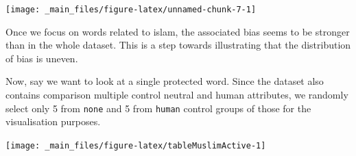 \documentclass[12pt,]{book}
\newenvironment{Shaded}{\begin{snugshade}}{\end{snugshade}}
\newcommand{\KeywordTok}[1]{\textcolor[rgb]{0.13,0.29,0.53}{\textbf{#1}}}
\newcommand{\DecValTok}[1]{\textcolor[rgb]{0.00,0.00,0.81}{#1}}
\newcommand{\StringTok}[1]{\textcolor[rgb]{0.31,0.60,0.02}{#1}}
\newcommand{\CommentTok}[1]{\textcolor[rgb]{0.56,0.35,0.01}{\textit{#1}}}
\newcommand{\OperatorTok}[1]{\textcolor[rgb]{0.81,0.36,0.00}{\textbf{#1}}}
\newcommand{\NormalTok}[1]{#1}
\begin{document}
\begin{center}\texttt{[image: \_main\_files/figure-latex/unnamed-chunk-7-1]} \end{center}

\normalsize

\noindent Once we focus on words related to islam, the associated bias
seems to be stronger than in the whole dataset. This is a step towards
illustrating that the distribution of bias is uneven.

Now, say we want to look at a single protected word. Since the dataset
also contains comparison multiple control neutral and human attributes,
we randomly select only 5 from \texttt{none} and 5 from \texttt{human}
control groups of those for the visualisation purposes.

\vspace{1mm} \footnotesize

\begin{Shaded}
\end{Shaded}

\begin{center}\texttt{[image: \_main\_files/figure-latex/tableMuslimActive-1]} \end{center}
\end{document}
